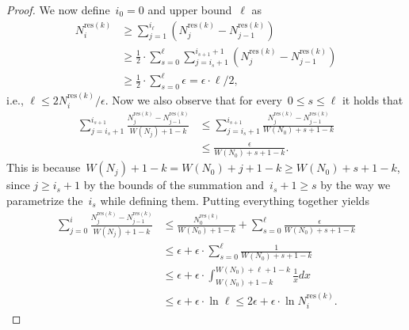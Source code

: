 \documentclass[sigconf]{acmart}
\newcommand{\parentheses}[1]{\left(#1\right)}
\begin{document}
\begin{proof}
    We now define~$i_0=0$ and upper bound~$\ell$ as
    \begin{align*}
        N^{\text{res}(k)}_i  & \geq \sum_{j=1}^{i_{\ell}} \parentheses{N^{\text{res}(k)}_j- N^{\text{res}(k)}_{j-1}}\\
        &\geq \frac{1}{2} \cdot \sum_{s=0}^{\ell} \sum_{j=i_{s}+1}^{i_{s+1}+1} \parentheses{N^{\text{res}(k)}_j- N^{\text{res}(k)}_{j-1}} \\
        &\geq \frac{1}{2} \cdot \sum_{s=0}^{\ell}  \epsilon = \epsilon \cdot \ell/2,
    \end{align*}
    i.e., $\ell \leq 2 N^{\text{res}(k)}_i/\epsilon$. Now we also observe that
    for every~$0 \leq s \leq \ell$ it holds that
    \begin{align*}
        \sum_{j=i_s+1}^{i_{s+1}}\frac{N^{\text{res}(k)}_j- N^{\text{res}(k)}_{j-1}}{W(N_j)+1-k} &\leq \sum_{j=i_s+1}^{i_{s+1}} \frac{N^{\text{res}(k)}_j- N^{\text{res}(k)}_{j-1}}{W(N_0)+s+1-k} \\
        & \leq \frac{\epsilon}{W(N_0)+s+1-k}.
    \end{align*}
    This is because~$W(N_j)+1-k = W(N_0)+j+1-k \geq W(N_0)+s+1-k$, since $j
    \geq i_s+1$ by the bounds of the summation and~$i_s+1 \geq s$ by the way we
    parametrize the~$i_s$ while defining them. Putting everything together
    yields
    \begin{align*}
        \sum_{j=0}^i  \frac{N^{\text{res}(k)}_j- N^{\text{res}(k)}_{j-1}}{W(N_j)+1-k} &\leq \frac{N^{\text{res}(k)}_0} {W(N_0)+1-k} + \sum_{s=0}^{\ell}  \frac{\epsilon}{W(N_0)+s+1-k} \\
        & \leq \epsilon + \epsilon \cdot \sum_{s=0}^{\ell}  \frac{1}{W(N_0)+s+1-k} \\
        & \leq \epsilon + \epsilon \cdot \int_{W(N_0)+1-k}^{W(N_0)+\ell+1-k}  \frac{1}{x} dx \\
        & \leq \epsilon + \epsilon \cdot \ln \ell \leq 2 \epsilon + \epsilon \cdot \ln N^{\text{res}(k)}_i.
    \end{align*}


\end{proof}
\end{document}

